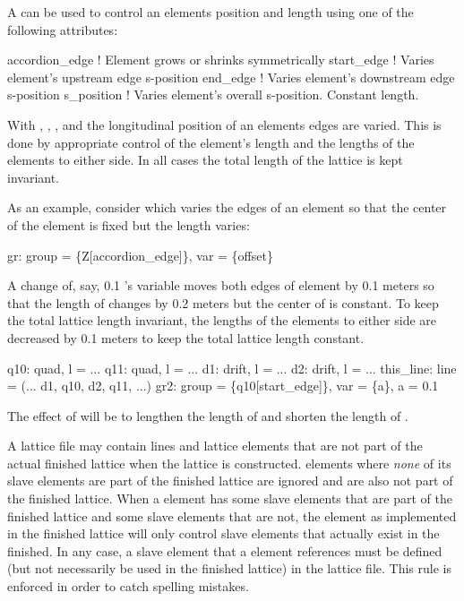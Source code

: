 A  can be used to control an elements position and length
using one of the following attributes:
\begin{example}
  accordion_edge  ! Element grows or shrinks symmetrically
  start_edge      ! Varies element's upstream edge s-position
  end_edge        ! Varies element's downstream edge s-position
  s_position      ! Varies element's overall s-position. Constant length.
\end{example}
With , , , and  the longitudinal
position of an elements edges are varied. This is done by appropriate control of the element's
length and the lengths of the elements to either side. In all cases the total length of the lattice
is kept invariant.

As an example, consider  which varies the edges of an element so that the center
of the element is fixed but the length varies:
\begin{example}
  gr: group = \{Z[accordion_edge]\}, var = \{offset\}
\end{example}
A change of, say, 0.1 's  variable moves both edges
of element  by 0.1 meters so that the length of  changes
by 0.2 meters but the center of  is constant. To keep the total
lattice length invariant, the lengths of the elements to either side
are decreased by 0.1 meters to keep the total lattice length constant.
\begin{example}
  q10: quad, l = ...
  q11: quad, l = ...
  d1: drift, l = ...
  d2: drift, l = ...
  this_line: line = (... d1, q10, d2, q11, ...)
  gr2: group = \{q10[start_edge]\}, var = \{a\}, a = 0.1
\end{example}
The effect of   will be to lengthen the length of
 and shorten the length of .

A lattice file may contain lines and lattice elements that are not part of the actual finished
lattice when the lattice is constructed.  elements where {\em none} of its slave elements
are part of the finished lattice are ignored and are also not part of the finished lattice.  When a
 element has some slave elements that are part of the finished lattice and some slave
elements that are not, the  element as implemented in the finished lattice will only
control slave elements that actually exist in the finished. In any case, a slave element that a
 element references must be defined (but not necessarily be used in the finished lattice)
in the lattice file. This rule is enforced in order to catch spelling mistakes.

